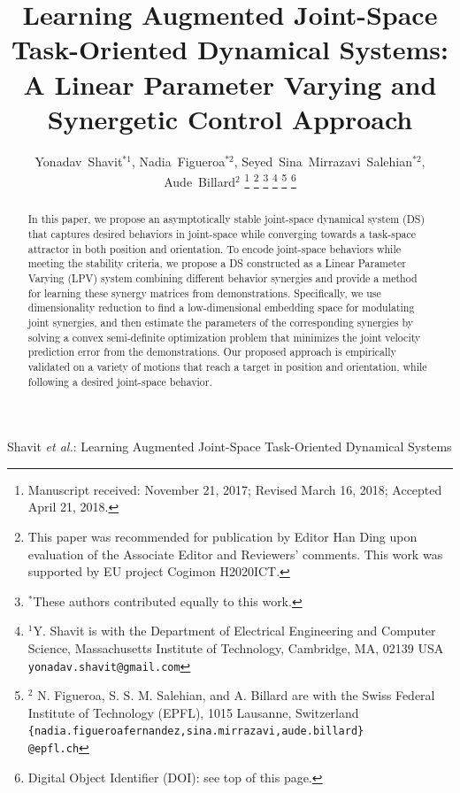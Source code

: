 \documentclass[letterpaper, 10 pt, journal, twoside, fleqn]{IEEEtran}
\begin{document}
	
{Shavit \MakeLowercase{\textit{et al.}}: Learning Augmented Joint-Space Task-Oriented Dynamical Systems}
%
\title{Learning Augmented Joint-Space Task-Oriented Dynamical Systems: A
Linear Parameter Varying and Synergetic Control Approach}


%
%
\author{Yonadav~Shavit$^{*1}$, Nadia~Figueroa$^{*2}$, Seyed~Sina~Mirrazavi~Salehian$^{*2}$, Aude~Billard$^{2}$
\thanks{Manuscript received: November 21, 2017; Revised March 16, 2018; Accepted April 21, 2018.}%
\thanks{This paper was recommended for publication by Editor Han Ding upon evaluation of the Associate Editor and Reviewers' comments. 
This work was supported by EU project Cogimon H2020\textendash ICT.}
\thanks{$^*$These authors contributed equally to this work.}
\thanks{$^{1}$Y. Shavit is with the Department of Electrical Engineering and Computer Science, Massachusetts Institute of Technology, Cambridge,
MA, 02139 USA {\tt\footnotesize yonadav.shavit@gmail.com}}%
\thanks{$^{2}$ N. Figueroa, S. S. M. Salehian, and A. Billard are with the Swiss Federal Institute of Technology (EPFL), 1015 Lausanne, Switzerland
{\tt\footnotesize\{nadia.figueroafernandez,sina.mirrazavi,aude.billard\}\\ \tt\footnotesize @epfl.ch}}%
\thanks{Digital Object Identifier (DOI): see top of this page.}%
}


\maketitle



\begin{abstract}
In this paper, we propose an asymptotically stable joint-space dynamical system (DS) that captures desired behaviors in joint-space while converging towards a task-space attractor in both position and orientation.  To encode joint-space behaviors while meeting the stability criteria, we propose a DS constructed as a Linear Parameter Varying (LPV) system combining different behavior synergies and provide a method for learning these synergy matrices from demonstrations. Specifically, we use dimensionality reduction to find a low-dimensional embedding space for modulating joint synergies, and then estimate the parameters of the corresponding synergies by solving a convex semi-definite optimization problem that minimizes the joint velocity prediction error from the demonstrations. Our proposed approach is empirically validated on a variety of motions that reach a target in position and orientation, while following a desired joint-space behavior.
 \end{abstract}
\end{document}
